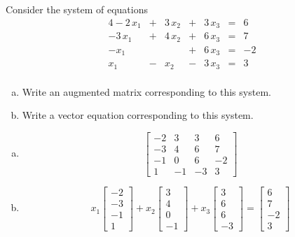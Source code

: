 
\begin{exerciseStatement}


 Consider the system of equations 
\begin{alignat*}{4} -2 \, x_{1} &+& 3 \, x_{2} &+& 3 \, x_{3} &=& 6 \\-3 \, x_{1} &+& 4 \, x_{2} &+& 6 \, x_{3} &=& 7 \\-x_{1} & &  &+& 6 \, x_{3} &=& -2 \\x_{1} &-& x_{2} &-& 3 \, x_{3} &=& 3 \\ \end{alignat*}
            


\begin{enumerate}[(a)]
\item  Write an augmented matrix corresponding to this system. 
\item  Write a vector equation corresponding to this system. 
\end{enumerate}
    
\end{exerciseStatement}
    
\begin{exerciseAnswer} 

\begin{enumerate}[(a)]
\item \[ \left[\begin{array}{ccc|c}
-2 & 3 & 3 & 6 \\
-3 & 4 & 6 & 7 \\
-1 & 0 & 6 & -2 \\
1 & -1 & -3 & 3
\end{array}\right] \]
\item \[ x_{1} \left[\begin{array}{c}
-2 \\
-3 \\
-1 \\
1
\end{array}\right] + x_{2} \left[\begin{array}{c}
3 \\
4 \\
0 \\
-1
\end{array}\right] + x_{3} \left[\begin{array}{c}
3 \\
6 \\
6 \\
-3
\end{array}\right] = \left[\begin{array}{c}
6 \\
7 \\
-2 \\
3
\end{array}\right] \]
\end{enumerate}
    
\end{exerciseAnswer}
    
